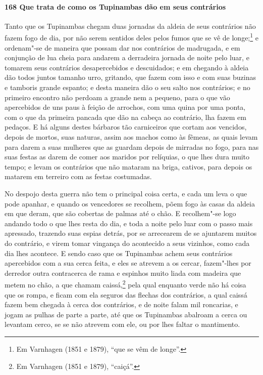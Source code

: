 \begin{linenumbers}
\paragraph{168 Que trata de como os Tupinambas dão em seus contrários}\quad
Tanto que os Tupinambas chegam duas jornadas da aldeia de seus contrários não fazem fogo
de dia, por não serem sentidos deles pelos fumos que se vê de longe;\footnote{ Em
Varnhagen (1851 e 1879), ``que se vêm de longe''.} e ordenam"-se de maneira que possam dar
nos contrários de madrugada, e em conjunção de lua cheia para andarem a derradeira jornada
de noite pelo luar, e tomarem seus contrários desapercebidos e descuidados; e em chegando
à aldeia dão todos juntos tamanho urro, gritando, que fazem com isso e com suas buzinas e
tamboris grande espanto; e desta maneira dão o seu salto nos contrários; e no primeiro
encontro não perdoam a grande nem a pequeno, para o que vão apercebidos de uns paus à
feição de arrochos, com uma quina por uma ponta, com o que da primeira pancada que dão na
cabeça ao contrário, lha fazem em pedaços. E há alguns destes bárbaros tão carniceiros que
cortam aos vencidos, depois de mortos, suas naturas, assim aos machos como às fêmeas, as
quais levam para darem a suas mulheres que as guardam depois de mirradas no fogo, para nas
suas festas as darem de comer aos maridos por relíquias, o que lhes dura muito tempo; e
levam os contrários que não mataram na briga, cativos, para depois os matarem em terreiro
com as festas costumadas.

No despojo desta guerra não tem o principal coisa certa, e cada um leva o que pode
apanhar, e quando os vencedores se recolhem, põem fogo às casas da aldeia em que deram,
que são cobertas de palmas até o chão. E recolhem"-se logo andando todo o que lhes resta do
dia, e toda a noite pelo luar com o passo mais apressado, trazendo suas espias detrás, por
se arrecearem de se ajuntarem muitos do contrário, e virem tomar vingança do acontecido a
seus vizinhos, como cada dia lhes acontece. E sendo caso que os Tupinambas achem seus
contrários apercebidos com a sua cerca feita, e eles se atrevem a os cercar, fazem"-lhes
por derredor outra contracerca de rama e espinhos muito liada com madeira que metem no
chão, a que chamam caissá,\footnote{ Em Varnhagen (1851 e 1879), ``caiçá''.} pela qual
enquanto verde não há coisa que os rompa, e ficam com ela seguros das flechas dos
contrários, a qual caissá fazem bem chegada à cerca dos contrários, e de noite falam mil
roncarias, e jogam as pulhas de parte a parte, até que os Tupinambas abalroam a cerca ou
levantam cerco, se se não atrevem com ele, ou por lhes faltar o mantimento.


\end{linenumbers}
